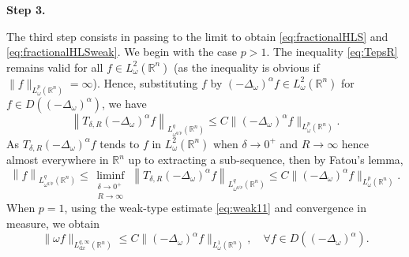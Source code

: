 \documentclass[12pt, letterpaper]{amsart}
\theoremstyle{definition}
\theoremstyle{remark}
\numberwithin{equation}{section}
\begin{document}
    \bigskip
    
    \noindent\textbf{Step 3.} {The third step consists in passing to the limit to obtain \eqref{eq:fractionalHLS} and \eqref{eq:fractionalHLSweak}. We begin with the case $p>1$.   The inequality \eqref{eq:TepsR} remains valid for all $f \in L^2_\omega(\mathbb{R}^n)$ (as the inequality is obvious if $\|f \|_{L^p_\omega(\mathbb{R}^n)}=\infty$). Hence, substituting $f$ by $(-\Delta_\omega)^\alpha f\in L^2_\omega(\mathbb{R}^n)$ for   $f\in D((-\Delta_\omega)^\alpha)$, we have 
    $$\left\| T_{\delta,R}(-\Delta_\omega)^\alpha f\right\|_{L^{q}_{\omega^{q/p}}(\mathbb{R}^n)} \leq C  \|(-\Delta_\omega)^\alpha f \|_{L^p_\omega(\mathbb{R}^n)}. $$
    As $ T_{\delta,R}(-\Delta_\omega)^\alpha f$ tends to $f$ in $L^2_\omega(\mathbb{R}^n)$ when $\delta \to 0^+$ and $R \to \infty$ hence almost everywhere in $\mathbb{R}^n$ up to extracting a sub-sequence, then by Fatou's lemma,
    \begin{equation}\label{eq:CRF}
        \left\|  f\right\|_{L^{q}_{\omega^{q/p}}(\mathbb{R}^n)} \leq \liminf_{\substack{\delta \to 0^+ \\ R \to \infty}} \, \left\| T_{\delta,R}(-\Delta_\omega)^\alpha f\right\|_{L^{q}_{\omega^{q/p}}(\mathbb{R}^n)} \leq C \|(-\Delta_\omega)^\alpha f \|_{L^p_\omega(\mathbb{R}^n)}.
    \end{equation}
    {When $p=1$, using  the weak-type estimate \eqref{eq:weak11} and convergence in measure, we obtain 
    \begin{equation*}
        \| \omega  f \|_{L^{q,\infty}_{\mathrm{d}x}(\mathbb{R}^n)} \leq C \| (-\Delta_\omega)^\alpha f \|_{L^1_{\omega}(\mathbb{R}^n)}, \quad \forall f \in D((-\Delta_\omega)^\alpha).
    \end{equation*}}
    
    \bigskip
    
}
\end{document}
